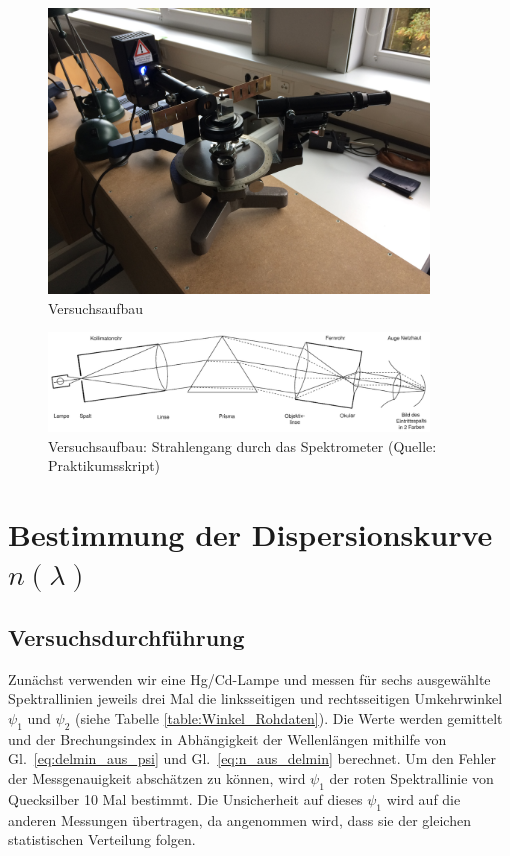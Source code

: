 \documentclass[12pt,a4paper]{article}
\begin{document}
\begin{figure}[H]
	\centering
	\includegraphics[width=0.9\textwidth]{Aufbau_Foto.jpg}
	\caption{Versuchsaufbau}
	\label{Aufbau_Foto}
\end{figure}
\begin{figure}[H]
	\centering
	\includegraphics[width=0.9\textwidth]{Spektrometer_Aufbau.png}
	\caption{Versuchsaufbau: Strahlengang durch das Spektrometer (Quelle: Praktikumsskript)}
	\label{Spektrometer_Aufbau}
\end{figure}

\section{Bestimmung der Dispersionskurve $n(\lambda)$}

\subsection{Versuchsdurchführung}

Zunächst verwenden wir eine Hg/Cd-Lampe und messen für sechs ausgewählte Spektrallinien  jeweils drei Mal die linksseitigen und rechtsseitigen Umkehrwinkel $\psi_1$ und $\psi_2$ (siehe Tabelle \ref{table:Winkel_Rohdaten}). Die Werte werden gemittelt und der Brechungsindex in Abhängigkeit der Wellenlängen mithilfe von Gl.~\eqref{eq:delmin_aus_psi} und Gl.~\eqref{eq:n_aus_delmin} berechnet. Um den Fehler der Messgenauigkeit abschätzen zu können, wird $\psi_1$ der roten Spektrallinie von Quecksilber 10 Mal bestimmt. Die Unsicherheit auf dieses $\psi_1$ wird auf die anderen Messungen übertragen, da angenommen wird, dass sie der gleichen statistischen Verteilung folgen.
\end{document}
